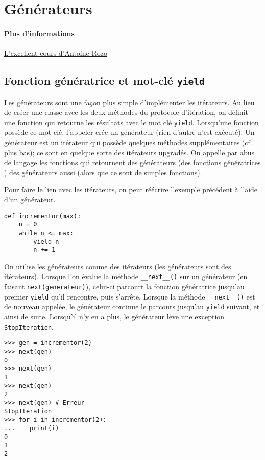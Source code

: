 \section{Générateurs}

\paragraph{Plus d'informations} \href{https://zestedesavoir.com/tutoriels/954/notions-de-python-avancees/3-further/1-generators/}{L'excellent cours d'Antoine Rozo}
\subsection{Fonction génératrice et mot-clé \texttt{yield}}

Les générateurs sont une façon plus simple d'implémenter les itérateurs. Au lieu de créer une classe avec les deux méthodes du protocole d'itération, on définit une fonction qui retourne les résultats avec le mot clé \texttt{yield}. Lorsqu'une fonction possède ce mot-clé, l'appeler crée un générateur (rien d'autre n'est exécuté). Un générateur est un itérateur qui possède quelques méthodes supplémentaires (cf. plus bas); ce sont en quelque sorte des itérateurs upgradés. On appelle par abus de langage les fonctions qui retournent des générateurs (des \og fonctions génératrices \fg{}) des générateurs aussi (alors que ce sont de simples fonctions).\bigskip

Pour faire le lien avec les itérateurs, on peut réécrire l'exemple précédent à l'aide d'un générateur.
\begin{verbatim}
def incrementor(max):
    n = 0
    while n <= max:
        yield n
        n += 1
\end{verbatim}

On utilise les générateurs comme des itérateurs (les générateurs sont des itérateurs). Lorsque l'on évalue la méthode \texttt{__next__()} sur un générateur (en faisant \texttt{next(generateur)}), celui-ci parcourt la fonction génératrice jusqu'au premier \texttt{yield} qu'il rencontre, puis s'arrête. Lorsque la méthode \texttt{__next__()} est de nouveau appelée, le générateur continue le parcours jusqu'au \texttt{yield} suivant, et ainsi de suite. Lorsqu'il n'y en a plus, le générateur lève une exception \texttt{StopIteration}.
\begin{verbatim}
>>> gen = incrementor(2)
>>> next(gen)
0
>>> next(gen)
1
>>> next(gen)
2
>>> next(gen) # Erreur
StopIteration
>>> for i in incrementor(2):
...    print(i)
0
1
2
\end{verbatim}

